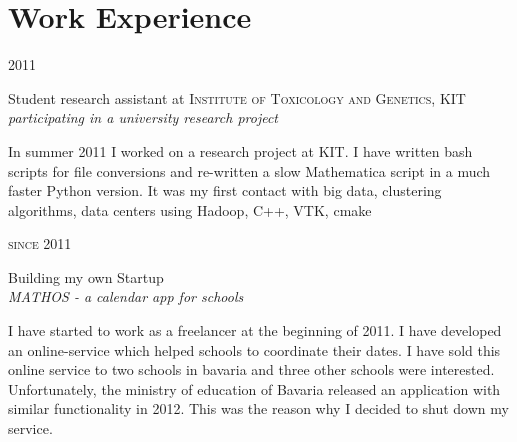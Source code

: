 \documentclass[a4paper,10pt]{article} %
\begin{document}
{\begin{minipage}[t]{0.44\textwidth}

\end{minipage} %

\begin{minipage}[t]{0.5\textwidth}
\vspace{0pt} %


\section{Work Experience}

{\raggedleft\textsc{2011}\par}

{\raggedright\large Student research assistant at \textsc{ Institute of Toxicology and Genetics}, KIT\\
\textit{participating in a university research project}\\[5pt]}

\normalsize{In summer 2011 I worked on a
research project at KIT. I have written bash scripts for file
conversions and re-written a slow Mathematica script
in a much faster Python version. It was my first contact with big data,
clustering algorithms, data centers using Hadoop, C++, VTK, cmake}\\


{\raggedleft\textsc{since 2011}\par}

{\raggedright\large Building my own Startup\\
\textit{MATHOS - a calendar app for schools}\\[5pt]}

\normalsize{I have started to work as a freelancer at the beginning
of 2011. I have developed an online-service which helped
schools to coordinate their dates. I have sold this online service to
two schools in bavaria and three other schools were interested.
Unfortunately, the ministry of education of Bavaria
released an application with similar functionality in
2012. This was the reason why I decided to shut down my service.}\\


\end{minipage}}
\end{document}
